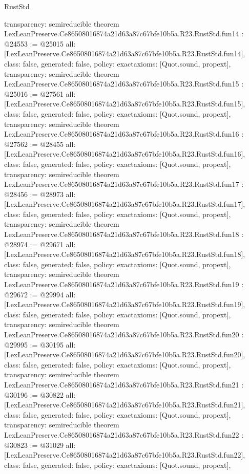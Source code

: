 \begin{lexlean}{RustStd}
\begin{coremodule}
{  transparency: semireducible
}
theorem LexLeanPreserve.Ce86508016874a21d63a87c67bfe10b5a.R23.RustStd.fun14 : @24553 := @25015 {
  all: [LexLeanPreserve.Ce86508016874a21d63a87c67bfe10b5a.R23.RustStd.fun14],
  class: false,
  generated: false,
  policy: exact{axioms: [Quot.sound, propext]},
  transparency: semireducible
}
theorem LexLeanPreserve.Ce86508016874a21d63a87c67bfe10b5a.R23.RustStd.fun15 : @25016 := @27561 {
  all: [LexLeanPreserve.Ce86508016874a21d63a87c67bfe10b5a.R23.RustStd.fun15],
  class: false,
  generated: false,
  policy: exact{axioms: [Quot.sound, propext]},
  transparency: semireducible
}
theorem LexLeanPreserve.Ce86508016874a21d63a87c67bfe10b5a.R23.RustStd.fun16 : @27562 := @28455 {
  all: [LexLeanPreserve.Ce86508016874a21d63a87c67bfe10b5a.R23.RustStd.fun16],
  class: false,
  generated: false,
  policy: exact{axioms: [Quot.sound, propext]},
  transparency: semireducible
}
theorem LexLeanPreserve.Ce86508016874a21d63a87c67bfe10b5a.R23.RustStd.fun17 : @28456 := @28973 {
  all: [LexLeanPreserve.Ce86508016874a21d63a87c67bfe10b5a.R23.RustStd.fun17],
  class: false,
  generated: false,
  policy: exact{axioms: [Quot.sound, propext]},
  transparency: semireducible
}
theorem LexLeanPreserve.Ce86508016874a21d63a87c67bfe10b5a.R23.RustStd.fun18 : @28974 := @29671 {
  all: [LexLeanPreserve.Ce86508016874a21d63a87c67bfe10b5a.R23.RustStd.fun18],
  class: false,
  generated: false,
  policy: exact{axioms: [Quot.sound, propext]},
  transparency: semireducible
}
theorem LexLeanPreserve.Ce86508016874a21d63a87c67bfe10b5a.R23.RustStd.fun19 : @29672 := @29994 {
  all: [LexLeanPreserve.Ce86508016874a21d63a87c67bfe10b5a.R23.RustStd.fun19],
  class: false,
  generated: false,
  policy: exact{axioms: [Quot.sound, propext]},
  transparency: semireducible
}
theorem LexLeanPreserve.Ce86508016874a21d63a87c67bfe10b5a.R23.RustStd.fun20 : @29995 := @30195 {
  all: [LexLeanPreserve.Ce86508016874a21d63a87c67bfe10b5a.R23.RustStd.fun20],
  class: false,
  generated: false,
  policy: exact{axioms: [Quot.sound, propext]},
  transparency: semireducible
}
theorem LexLeanPreserve.Ce86508016874a21d63a87c67bfe10b5a.R23.RustStd.fun21 : @30196 := @30822 {
  all: [LexLeanPreserve.Ce86508016874a21d63a87c67bfe10b5a.R23.RustStd.fun21],
  class: false,
  generated: false,
  policy: exact{axioms: [Quot.sound, propext]},
  transparency: semireducible
}
theorem LexLeanPreserve.Ce86508016874a21d63a87c67bfe10b5a.R23.RustStd.fun22 : @30823 := @31029 {
  all: [LexLeanPreserve.Ce86508016874a21d63a87c67bfe10b5a.R23.RustStd.fun22],
  class: false,
  generated: false,
  policy: exact{axioms: [Quot.sound, propext]},
}
\end{coremodule}
\end{lexlean}
